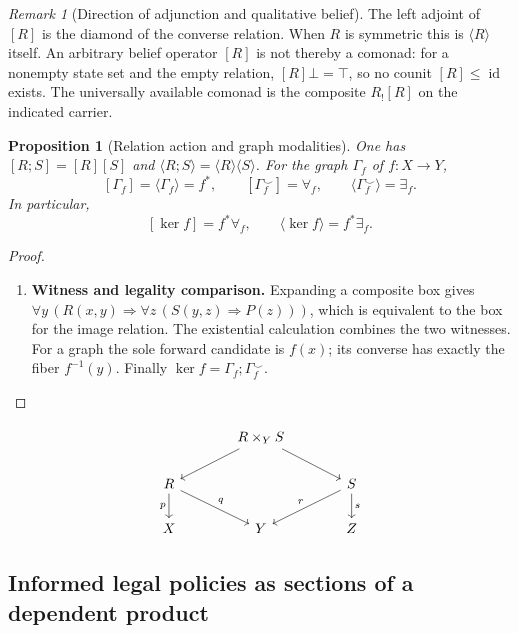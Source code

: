 \documentclass[11pt,a4paper]{article}
\numberwithin{equation}{section}
\newtheorem{proposition}[theorem]{Proposition}
\theoremstyle{definition}
\theoremstyle{remark}
\newtheorem{remark}[theorem]{Remark}
\theoremstyle{plain}
\begin{document}
\begin{remark}[Direction of adjunction and qualitative belief]
The left adjoint of $[R]$ is the diamond of the converse relation.
When $R$ is symmetric this is $\langle R\rangle$ itself. An arbitrary
belief operator $[R]$ is not thereby a comonad: for a nonempty state set
and the empty relation, $[R]\bot=\top$, so no counit
$[R]\leq\operatorname{id}$ exists. The universally available comonad
is the composite $R_![R]$ on the indicated carrier.
\end{remark}

\begin{proposition}[Relation action and graph modalities]
\label{prop:egt-graph-modalities}
One has $[R;S]=[R][S]$ and
$\langle R;S\rangle=\langle R\rangle\langle S\rangle$.
For the graph $\Gamma_f$ of $f:X\to Y$,
\[
 [\Gamma_f]=\langle\Gamma_f\rangle=f^*,\qquad
 [\Gamma_f^\smile]=\forall_f,\qquad
 \langle\Gamma_f^\smile\rangle=\exists_f.
\]
In particular,
\begin{equation}\label{eq:egt-kernel-modality-factorization}
 [\ker f]=f^*\forall_f,\qquad
 \langle\ker f\rangle=f^*\exists_f.
\end{equation}
\end{proposition}
\begin{proof}
\leavevmode
\begin{enumerate}[label=\textup{(\arabic*)},leftmargin=*,itemsep=4pt,topsep=3pt]
  \item \textbf{Witness and legality comparison.} Expanding a composite box gives
$\forall y\,(R(x,y)\Rightarrow
\forall z\,(S(y,z)\Rightarrow P(z)))$, which is equivalent to the box
for the image relation. The existential calculation combines the two
witnesses. For a graph the sole forward candidate is $f(x)$; its converse
has exactly the fiber $f^{-1}(y)$. Finally
$\ker f=\Gamma_f;\Gamma_f^\smile$.
\end{enumerate}
\end{proof}

\[
\begin{tikzcd}[column sep=large]
 &R\times_Y S\arrow[dl]\arrow[dr]&\\
 R\arrow[d,"p"']\arrow[dr,"q"]&&S\arrow[dl,"r"']\arrow[d,"s"]\\
 X&Y&Z
\end{tikzcd}
\]

\subsection{Informed legal policies as sections of a dependent product}
\label{sec:egt-informed-legal-policies}
\end{document}
